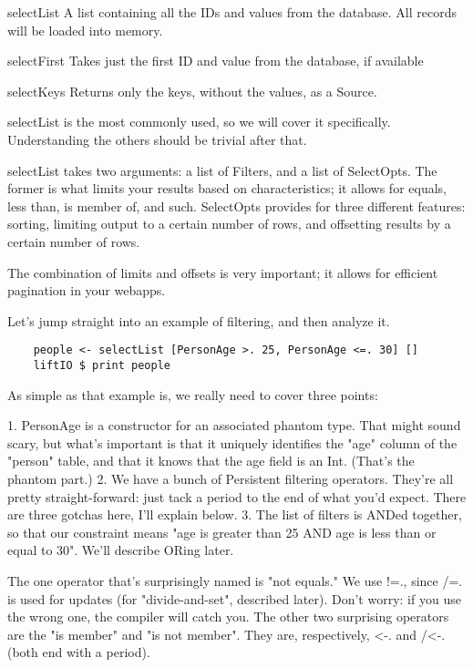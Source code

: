 selectList	A list containing all the IDs and values from the database. All records will be loaded into memory.

selectFirst	Takes just the first ID and value from the database, if available

selectKeys	Returns only the keys, without the values, as a Source.

selectList is the most commonly used, so we will cover it specifically. Understanding the others should be trivial after that.

selectList takes two arguments: a list of Filters, and a list of SelectOpts. The former is what limits your results based on characteristics; it allows for equals, less than, is member of, and such. SelectOpts provides for three different features: sorting, limiting output to a certain number of rows, and offsetting results by a certain number of rows.

The combination of limits and offsets is very important; it allows for efficient pagination in your webapps.

Let's jump straight into an example of filtering, and then analyze it.

\begin{lstlisting}
    people <- selectList [PersonAge >. 25, PersonAge <=. 30] []
    liftIO $ print people
\end{lstlisting}%

As simple as that example is, we really need to cover three points:


1. PersonAge is a constructor for an associated phantom type. That might sound scary, but what's important is that it uniquely identifies the "age" column of the "person" table, and that it knows that the age field is an Int. (That's the phantom part.)
2. We have a bunch of Persistent filtering operators. They're all pretty straight-forward: just tack a period to the end of what you'd expect. There are three gotchas here, I'll explain below.
3. The list of filters is ANDed together, so that our constraint means "age is greater than 25 AND age is less than or equal to 30". We'll describe ORing later.

The one operator that's surprisingly named is "not equals." We use !=., since /=. is used for updates (for "divide-and-set", described later). Don't worry: if you use the wrong one, the compiler will catch you. The other two surprising operators are the "is member" and "is not member". They are, respectively, <-. and /<-. (both end with a period).

